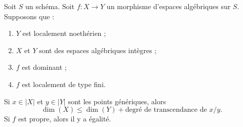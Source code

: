 \begin{lemma}
\label{lemma-alteration-dimension}
Soit $S$ un schéma. Soit $f : X \to Y$ un morphisme d'espaces algébriques
sur $S$. Supposons que :
\begin{enumerate}
\item $Y$ est localement noethérien ;
\item $X$ et $Y$ sont des espaces algébriques intègres ;
\item $f$ est dominant ;
\item $f$ est localement de type fini.
\end{enumerate}
Si $x \in |X|$ et $y \in |Y|$ sont les points génériques, alors
$$
\dim(X) \leq \dim(Y) + \text{degré de transcendance de }x/y.
$$
Si $f$ est propre, alors il y a égalité.
\end{lemma}

